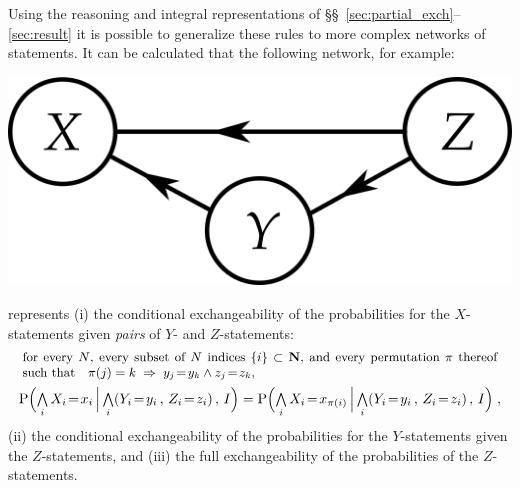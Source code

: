\documentclass[\ifafour a4paper,12pt,\else a5paper,10pt,\fi%
onecolumn,oneside,article,%
british%
]{memoir}
\theoremstyle{remark}
\theoremstyle{innote}
\newcommand*{\NN}{\bm{\mathrm{N}}}
\newcommand*{\Land}{\mathop{\textstyle\bigwedge}}
\DeclarePairedDelimiter\set{\{}{\}}
\newcommand*{\p}{\mathrm{P}}%
\renewcommand*{\|}[1][]{\nonscript\,#1\vert\nonscript\,\mathopen{}}
\newcommand*{\sects}{\S\S}%
\newcommand*{\mathbox}[2][.8\columnwidth]{\parbox[b]{#1}{#2}}
\newcommand*{\eq}{\mathrel{\!=\!}}
\renewcommand*{\=}{\TextOrMath\texteq\eq}
\newcommand*{\X}[1]{X_{#1}}
\newcommand*{\x}[1]{x_{#1}}
\newcommand*{\Y}[1]{Y_{#1}}
\newcommand*{\y}[1]{y_{#1}}
\newcommand*{\Z}[1]{Z_{#1}}
\newcommand*{\z}[1]{z_{#1}}
\begin{document}
Using the reasoning and integral representations of
\sects~\ref{sec:partial_exch}--\ref{sec:result} it is possible to
generalize these rules to more complex networks of statements. It can be
calculated that the following network, for example:
\begin{center}%
\includegraphics[scale=0.5]{bayesnet3.png}
\figcaption{\label{fig:dep3net}}  
\end{center}%
represents (i) the conditional exchangeability of the probabilities for the
$X$-statements given \emph{pairs} of $Y$- and $Z$-statements:
\begin{multline}
  \label{eq:part_exchangeableAB}
  \mathbox[0.99\linewidth]{\small for every $N$, every subset of $N$ indices $\set{i}
    \subset \NN$, and every permutation $\pi$ thereof such that\quad
    $\pi(j)=k \mathrel{\;\Rightarrow\;} \y{j}\eq\y{k}\land \z{j}\eq\z{k}$,}
  \\
  \p\Bigl( \Land_{i}\X{i}\=\x{i}  \|[\Big]
  \Land_{i}(\Y{i}\=\y{i}\,,\,\Z{i}\=\z{i}) \,,\,    I\Bigr) =
  \p\Bigl( \Land_{i}\X{i}\=\x{\pi(i)}  \|[\Big]
  \Land_{i}(\Y{i}\=\y{i}\,,\,\Z{i}\=\z{i}) \,,\, I\Bigr)
  \;,
\end{multline}
(ii) the conditional exchangeability of the probabilities for the
$Y$-statements given the $Z$-statements, 
and (iii) the full exchangeability of the probabilities of the
$Z$-statements.
\end{document}
